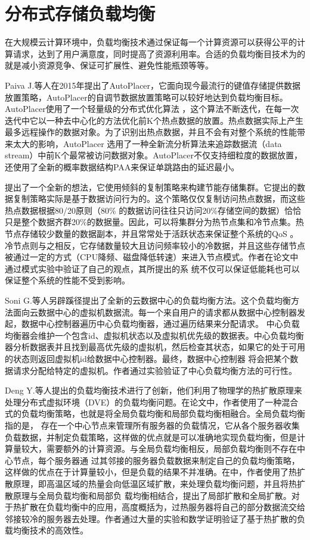 \section{分布式存储负载均衡}
在大规模云计算环境中，负载均衡技术通过保证每一个计算资源可以获得公平的计算请求，达到了用户满意度，同时提高了资源利用率。合适的负载均衡目技术为的就是减小资源竞争、保证可扩展性、避免性能瓶颈等等。

Paiva J.等人在2015年提出了AutoPlacer\cite{paiva2015uto}，它面向现今最流行的键值存储提供数据放置策略，AutoPlacer的自调节数据放置策略可以较好地达到负载均衡目标。AutoPlacer使用了一个轻量级的分布式优化算法
，这个算法不断迭代，在每一次迭代中它以一种去中心化的方法优化前K个热点数据的放置。热点数据实际上产生最多远程操作的数据对象。为了识别出热点数据，并且不会有对整个系统的性能带来太大的影响，AutoPlacer
选用了一种全新流分析算法来追踪数据流（data stream）中前K个最常被访问数据对象。AutoPlacer不仅支持细粒度的数据放置，还使用了全新的概率数据结构PAA来保证单跳路由的延迟最小。


提出了一个全新的想法，它使用倾斜的复制策略来构建节能存储集群。它提出的数据复制策略实际是基于数据访问行为的。这个策略仅仅复制访问热点数据，而这些热点数据根据80/20原则（80\%
的数据访问往往只访问20\%存储空间的数据）恰恰只是整个数据齐群20\%的数据量。因此，可以将集群分为热节点集和冷节点集。热节点存储较少数量的数据副本，并且常常处于活跃状态来保证整个系统的QoS
。冷节点则与之相反，它存储数量较大且访问频率较小的冷数据，并且这些存储节点被通过一定的方式（CPU降频、磁盘降低转速）来进入节点模式。作者在论文中通过模式实验中验证了自己的观点，其所提出的系
统不仅可以保证低能耗也可以保证整个系统的性能不受到影响。

Soni G.等人另辟蹊径提出了全新的云数据中心的负载均衡方法\cite{soni2014novel}。这个负载均衡方法面向云数据中心的虚拟机数据流。每一个来自用户的请求都从数据中心控制器发起，数据中心控制器遍历中心负载均衡器，通过遍历结果来分配请求。
中心负载均衡器会维护一个包含id、虚拟机状态以及虚拟机优先级的数据表。中心负载均衡器分析数据表并且找到最高优先级的虚拟机，然后检查其状态，如果它的处于可用的状态则返回虚拟机id给数据中心控制器。最终，数据中心控制器
将会把某个数据请求分配给特定的虚拟机。作者通过实验验证了中心负载均衡方法的可行性。

Deng Y.等人提出的负载均衡技术\cite{deng2014dynamic}进行了创新，他们利用了物理学的热扩散原理来处理分布式虚拟环境（DVE）的负载均衡问题。在论文中，作者使用了一种混合式的负载均衡策略，也就是将全局负载均衡和局部负载均衡相融合。全局负载均衡指的是，
存在一个中心节点来管理所有服务器的负载情况，它从各个服务器收集负载数据，并制定负载策略，这样做的优点就是可以准确地实现负载均衡，但是计算量较大，需要额外的计算资源。与全局负载均衡相反，局部负载均衡则不存在中心节点，每个服务器通
过其邻接的服务器负载数据来制定自己的负载均衡策略，这样做的优点在于计算量较小，但是负载的结果不并准确。在中，作者使用了热扩散原理，即高温区域的热量会向低温区域扩散，来处理负载均衡问题，并且将热扩散原理与全局负载均衡和局部负
载均衡相结合，提出了局部扩散和全局扩散。对于热扩散在负载均衡中的应用，高度概括为，过热服务器将自己的部分数据流交给邻接较冷的服务器去处理。作者通过大量的实验和数学证明验证了基于热扩散的负载均衡技术的高效性。

